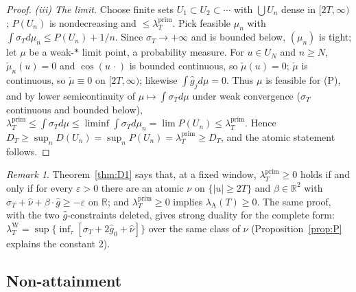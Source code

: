 \documentclass[11pt]{amsart}
\theoremstyle{definition}
\theoremstyle{remark}
\newtheorem{remark}[theorem]{Remark}
\newcommand{\R}{\mathbb R}
\newcommand{\lamP}{\lambda^{\mathrm{prim}}_T}
\newcommand{\lamW}{\lambda^{\mathrm W}_T}
\newcommand{\lamA}{\lambda_{\mathrm A}(T)}
\newcommand{\sT}{\sigma_T}
\newcommand{\gh}[1]{\widehat g_{#1}}
\newcommand{\nuh}{\widehat\nu}
\begin{document}
\begin{proof}
\emph{(iii) The limit.} Choose finite sets $U_1\subset U_2\subset\cdots$ with $\bigcup U_n$ dense in
$[2T,\infty)$; $P(U_n)$ is nondecreasing and $\le\lamP$. Pick feasible $\mu_n$ with
$\int\sT d\mu_n\le P(U_n)+1/n$. Since $\sT\to+\infty$ and is bounded below, $(\mu_n)$ is tight;
let $\mu$ be a weak-$*$ limit point, a probability measure. For $u\in U_N$ and $n\ge N$,
$\check\mu_n(u)=0$ and $\cos(u\,\cdot)$ is bounded continuous, so $\check\mu(u)=0$; $\check\mu$
is continuous, so $\check\mu\equiv0$ on $[2T,\infty)$; likewise $\int\gh jd\mu=0$. Thus $\mu$ is
feasible for (P), and by lower semicontinuity of $\mu\mapsto\int\sT d\mu$ under weak convergence
($\sT$ continuous and bounded below), $\lamP\le\int\sT d\mu\le\liminf\int\sT d\mu_n=\lim P(U_n)\le\lamP$.
Hence $D_T\ge\sup_nD(U_n)=\sup_nP(U_n)=\lamP\ge D_T$, and the atomic statement follows.
\end{proof}

\begin{remark}\label{rem:D1complete}
Theorem~\ref{thm:D1} says that, at a fixed window, $\lamP\ge0$ holds if and only if for every
$\varepsilon>0$ there are an atomic $\nu$ on $\{|u|\ge2T\}$ and $\beta\in\R^2$ with
$\sT+\nuh+\beta\cdot\widehat g\ge-\varepsilon$ on $\R$; and $\lamP\ge0$ implies $\lamA\ge0$. The same
proof, with the two $\widehat g$-constraints deleted, gives strong duality for the complete form:
$\lamW=\sup\{\inf_\tau[\sT+2\gh0+\nuh]\}$ over the same class of $\nu$ (Proposition~\ref{prop:P}
explains the constant $2$).
\end{remark}

\subsection{Non-attainment}
\end{document}
